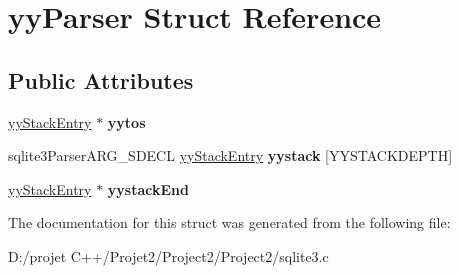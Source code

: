\hypertarget{structyy_parser}{}\section{yy\+Parser Struct Reference}
\label{structyy_parser}
\subsection*{Public Attributes}
\begin{DoxyCompactItemize}
\item 
\mbox{\label{structyy_parser_aa00139fa506498c5b8539d502d8052f0}} 
\mbox{\hyperlink{structyy_stack_entry}{yy\+Stack\+Entry}} $\ast$ {\bfseries yytos}
\item 
\mbox{\label{structyy_parser_ae8bc1531d6ae56020a7ee33a40783672}} 
sqlite3\+Parser\+A\+R\+G\+\_\+\+S\+D\+E\+CL \mbox{\hyperlink{structyy_stack_entry}{yy\+Stack\+Entry}} {\bfseries yystack} \mbox{[}Y\+Y\+S\+T\+A\+C\+K\+D\+E\+P\+TH\mbox{]}
\item 
\mbox{\label{structyy_parser_ab52f79567a18a9197c9d71892af23c43}} 
\mbox{\hyperlink{structyy_stack_entry}{yy\+Stack\+Entry}} $\ast$ {\bfseries yystack\+End}
\end{DoxyCompactItemize}


The documentation for this struct was generated from the following file\+:\begin{DoxyCompactItemize}
\item 
D\+:/projet C++/\+Projet2/\+Project2/\+Project2/sqlite3.\+c\end{DoxyCompactItemize}
